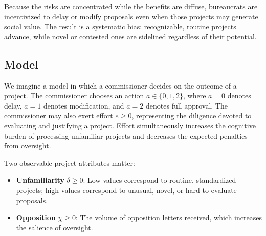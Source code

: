Because the risks are concentrated while the benefits are diffuse, bureaucrats are incentivized to delay or modify proposals even when those projects may generate social value. The result is a systematic bias: recognizable, routine projects advance, while novel or contested ones are sidelined regardless of their potential.


\subsection{Model}

We imagine a model in which a commissioner decides on the outcome of a project. The commissioner chooses an action $a \in \{0,1,2\}$, where $a=0$ denotes delay, $a=1$ denotes modification, and $a=2$ denotes full approval. The commissioner may 
also exert effort $e \geq 0$, representing the diligence devoted to evaluating and justifying a project. Effort simultaneously increases the cognitive burden of processing unfamiliar projects and decreases the expected penalties from oversight.

Two observable project attributes matter:

\begin{itemize}
    \item \textbf{Unfamiliarity} $\delta \geq 0$: Low values correspond to routine, standardized projects; high values correspond to unusual, novel, or hard to evaluate proposals.
    \item \textbf{Opposition} $\chi \geq 0$: The volume of opposition letters received, which increases the salience of oversight.
\end{itemize}


